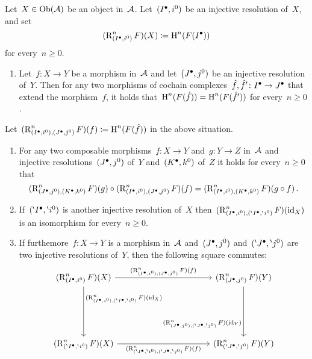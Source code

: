 \begin{lemma}
  \label{preparation for right derived functors}
  Let~$X \in \operatorname{Ob}(\mathcal{A})$ be an object in~$\mathcal{A}$.
  Let~$(I^\bullet, i^0)$ be an injective resolution of~$X$, and set
  \[
    (\operatorname{R}^n_{(I^\bullet,i^0)}F)(X)
    \coloneqq
    \operatorname{H}^n( F(I^\bullet) )
  \]
  for every~$n \geq 0$.
  \begin{enumerate}
    \item
      \label{induced morphism in right derived}
      Let~$f \colon X \to Y$ be a morphism in~$\mathcal{A}$ and let~$(J^\bullet, j^0)$ be an injective resolution of~$Y$.
      Then for any two morphisms of cochain complexes~$\hat{f}, \hat{f}' \colon I^\bullet \to J^\bullet$ that extend the morphism~$f$, it holds that~$\operatorname{H}^n(F(\hat{f})) = \operatorname{H}^n(F(\hat{f}'))$  for every~$n \geq 0$.
  \end{enumerate}
  Let~$(\operatorname{R}^n_{(I^\bullet,i^0), (J^\bullet,j^0)} F)(f) \coloneqq \operatorname{H}^n(F(\hat{f}))$ in the above situation.
  \begin{enumerate}[resume]
    \item
      \label{functoriality of morphism between derived functors}
      For any two composable morphisms~$f \colon X \to Y$ and~$g \colon Y \to Z$ in~$\mathcal{A}$ and injective resolutions~$(J^\bullet, j^0)$ of~$Y$ and~$(K^\bullet,k^0)$ of~$Z$ it holds for every~$n \geq 0$ that
      \[
        (\operatorname{R}^n_{(J^\bullet,j^0), (K^\bullet,k^0)} F)(g)
        \circ
        (\operatorname{R}^n_{(I^\bullet,i^0), (J^\bullet,j^0)} F)(f)
        =
        (\operatorname{R}^n_{(I^\bullet,i^0), (K^\bullet,k^0)} F)(g \circ f)  \,.
      \]
    \item
      If~$({}^{\backprime}I^\bullet, {}^{\backprime} i^0)$ is another injective resolution of~$X$ then~$(\operatorname{R}^n_{(I^\bullet,i^0), ({}^{\backprime}I^\bullet, {}^{\backprime} i^0)} F)(\operatorname{id}_X)$ is an isomorphism for every~$n \geq 0$.
    \item
      If furthemore~$f \colon X \to Y$ is a morphism in~$\mathcal{A}$  and~$(J^\bullet, j^0)$ and~$({}^{\backprime}J^\bullet, {}^{\backprime} j^0)$ are two injective resolutions of~$Y$, then the following square commutes:
      \[
        \begin{tikzcd}[column sep = 11em, row sep = 6em]
            (\Right^n_{(\Iccc,i^0)} F)(X)
            \arrow{r}[above]{ (\Right^n_{(\Iccc,i^0), (\Jccc,j^0)} F)(f) }
            \arrow{d}[right, near start]{ (\Right^n_{(\Iccc,i^0), (\bp\Iccc, \bp i^0)} F)(\id_X) }
          & (\Right^n_{(\Jccc,j^0)} F)(Y)
            \arrow{d}[left, near end]{ (\Right^n_{(\Jccc,j^0), (\bp\Jccc, \bp j^0)} F)(\id_Y) }
          \\          
            (\Right^n_{(\bp\Iccc, \bp i^0)} F)(X)
            \arrow{r}[below]{ (\Right^n_{(\bp\Iccc, \bp i^0), (\bp\Jccc, \bp j^0)} F)(f) }
          & (\Right^n_{(\bp \Jccc, \bp j^0)} F)(Y)
        \end{tikzcd}
      \]
  \end{enumerate}
\end{lemma}



